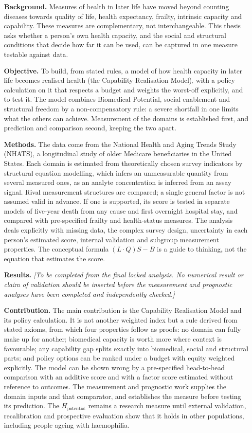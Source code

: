 \noindent\textbf{Background.}
Measures of health in later life have moved beyond counting diseases towards quality of life, health expectancy, frailty, intrinsic capacity and capability. These measures are complementary, not interchangeable. This thesis asks whether a person's own health capacity, and the social and structural conditions that decide how far it can be used, can be captured in one measure testable against data.

\noindent\textbf{Objective.}
To build, from stated rules, a model of how health capacity in later life becomes realised health (the Capability Realisation Model), with a policy calculation on it that respects a budget and weights the worst-off explicitly, and to test it. The model combines Biomedical Potential, social enablement and structural freedom by a non-compensatory rule: a severe shortfall in one limits what the others can achieve. Measurement of the domains is established first, and prediction and comparison second, keeping the two apart.

\noindent\textbf{Methods.}
The data come from the National Health and Aging Trends Study (NHATS), a longitudinal study of older Medicare beneficiaries in the United States. Each domain is estimated from theoretically chosen survey indicators by structural equation modelling, which infers an unmeasurable quantity from several measured ones, as an analyte concentration is inferred from an assay signal. Rival measurement structures are compared; a single general factor is not assumed valid in advance. If one is supported, its score is tested in separate models of five-year death from any cause and first overnight hospital stay, and compared with pre-specified frailty and health-status measures. The analysis deals explicitly with missing data, the complex survey design, uncertainty in each person's estimated score, internal validation and subgroup measurement properties. The conceptual formula $(L\cdot Q)S-B$ is a guide to thinking, not the equation that estimates the score.

\noindent\textbf{Results.}
\emph{[To be completed from the final locked analysis. No numerical result or claim of validation should be inserted before the measurement and prognostic analyses have been completed and independently checked.]}

\noindent\textbf{Contribution.}
The main contribution is the Capability Realisation Model and its policy calculation. It is not another weighted index but a rule derived from stated axioms, from which four properties follow as proofs: no domain can fully make up for another; biomedical capacity is worth more where context is favourable; any capability gap splits exactly into biomedical, social and structural parts; and policy options can be ranked under a budget with equity weighted explicitly. The model can be shown wrong by a pre-specified head-to-head comparison with an additive score and with a factor score estimated without reference to outcomes. The measurement and prognostic work supplies the domain inputs and that comparator, and establishes the measure before testing its prediction. The $H_{\text{potential}}$ remains a research measure until external validation, recalibration and prospective evaluation show that it holds in other populations, including people ageing with haemophilia.
